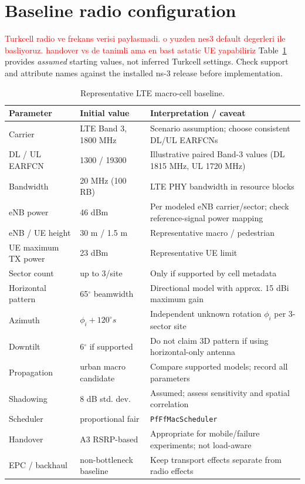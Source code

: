 \documentclass[11pt,a4paper]{article}
\newcommand{\red}[1]{\textcolor{red}{#1}}
\begin{document}
\section{Baseline radio configuration}
\red{Turkcell radio ve frekans verisi paylasmadi. o yuzden nes3 default degerleri ile basliyoruz. handover vs de tanimli ama en bast astatic UE yapabiliriz}
Table~\ref{tab:radio} provides \emph{assumed} starting values, not inferred Turkcell settings. Check support and attribute names against the installed ns-3 release before implementation.
\begin{table}[ht]\centering\small
\caption{Representative LTE macro-cell baseline.}\label{tab:radio}
\begin{tabularx}{\linewidth}{@{}l l X@{}}\toprule
Parameter & Initial value & Interpretation / caveat \\
\midrule
Carrier & LTE Band 3, 1800 MHz & Scenario assumption; choose consistent DL/UL EARFCNs \\
DL / UL EARFCN & 1300 / 19300 & Illustrative paired Band-3 values (DL 1815 MHz, UL 1720 MHz) \\
Bandwidth & 20 MHz (100 RB) & LTE PHY bandwidth in resource blocks \\
eNB power & 46 dBm & Per modeled eNB carrier/sector; check reference-signal power mapping \\
eNB / UE height & 30 m / 1.5 m & Representative macro / pedestrian \\
UE maximum TX power & 23 dBm & Representative UE limit \\
Sector count & up to 3/site & Only if supported by cell metadata \\
Horizontal pattern & 65$^\circ$ beamwidth & Directional model with approx. 15 dBi maximum gain \\
Azimuth & $\phi_i+120^\circ s$ & Independent unknown rotation $\phi_i$ per 3-sector site \\
Downtilt & 6$^\circ$ if supported & Do not claim 3D pattern if using horizontal-only antenna \\
Propagation & urban macro candidate & Compare supported models; record all parameters \\
Shadowing & 8 dB std. dev. & Assumed; assess sensitivity and spatial correlation \\
Scheduler & proportional fair & \texttt{PfFfMacScheduler} \\
Handover & A3 RSRP-based & Appropriate for mobile/failure experiments; not load-aware \\
EPC / backhaul & non-bottleneck baseline & Keep transport effects separate from radio effects \\
\bottomrule\end{tabularx}\end{table}
\end{document}
